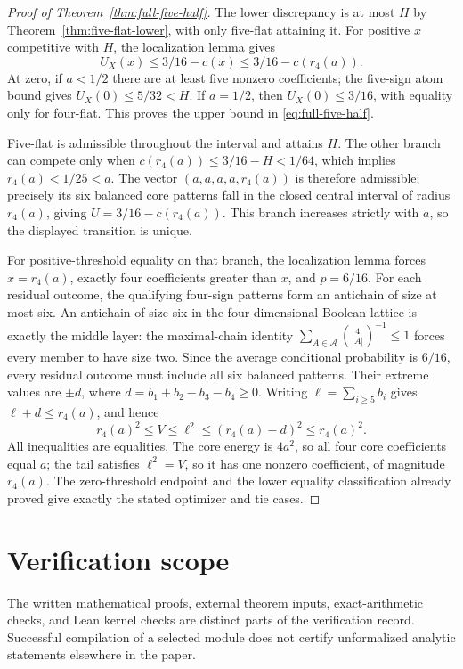 \documentclass[11pt]{article}
\theoremstyle{remark}\newtheorem{remark}[theorem]{Remark}
\begin{document}
\begin{proof}[Proof of Theorem~\ref{thm:full-five-half}]
The lower discrepancy is at most $H$ by
Theorem~\ref{thm:five-flat-lower}, with only five-flat attaining it.
For positive $x$ competitive with $H$, the localization lemma gives
\[
 U_X(x)\le3/16-c(x)\le3/16-c(r_4(a)).
\]
At zero, if $a<1/2$ there are at least five nonzero coefficients;
the five-sign atom bound gives $U_X(0)\le5/32<H$. If $a=1/2$,
then $U_X(0)\le3/16$, with equality only for four-flat.
This proves the upper bound in \eqref{eq:full-five-half}.

Five-flat is admissible throughout the interval and attains $H$.
The other branch can compete only when
$c(r_4(a))\le3/16-H<1/64$, which implies
$r_4(a)<1/25<a$. The vector $(a,a,a,a,r_4(a))$ is therefore
admissible; precisely its six balanced core patterns fall in the
closed central interval of radius $r_4(a)$, giving
$U=3/16-c(r_4(a))$. This branch increases strictly with $a$,
so the displayed transition is unique.

For positive-threshold equality on that branch, the localization
lemma forces $x=r_4(a)$, exactly four coefficients greater than $x$,
and $p=6/16$. For each residual outcome, the qualifying four-sign
patterns form an antichain of size at most six. An antichain of size
six in the four-dimensional Boolean lattice is exactly the middle
layer: the maximal-chain identity
$\sum_{A\in\mathcal A}\binom4{|A|}^{-1}\le1$
forces every member to have size two. Since the average conditional
probability is $6/16$, every residual outcome must include all six
balanced patterns. Their extreme values are $\pm d$, where
$d=b_1+b_2-b_3-b_4\ge0$. Writing
$\ell=\sum_{i\ge5}b_i$ gives $\ell+d\le r_4(a)$, and hence
\[
 r_4(a)^2\le V\le\ell^2\le(r_4(a)-d)^2\le r_4(a)^2.
\]
All inequalities are equalities. The core energy is $4a^2$, so all
four core coefficients equal $a$; the tail satisfies $\ell^2=V$,
so it has one nonzero coefficient, of magnitude $r_4(a)$.
The zero-threshold endpoint and the lower equality classification
already proved give exactly the stated optimizer and tie cases.
\end{proof}

\section{Verification scope}\label{sec:verification}
The written mathematical proofs, external theorem inputs, exact-arithmetic
checks, and Lean kernel checks are distinct parts of the verification
record. Successful compilation of a selected module does not certify
unformalized analytic statements elsewhere in the paper.
\end{document}

